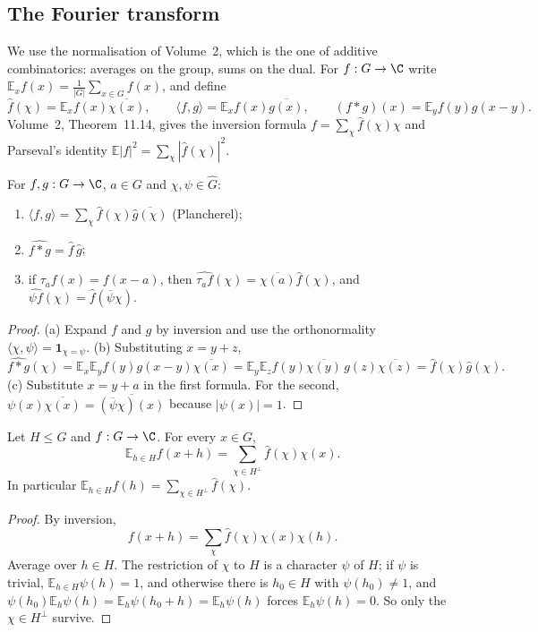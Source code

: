 \subsection*{The Fourier transform}

We use the normalisation of Volume~2, which is the one of additive combinatorics: averages on the group, sums on the dual. For
$f:G\to\C$ write $\mathbb E_{x}f(x)=\frac1{|G|}\sum_{x\in G}f(x)$, and define
\[\hat f(\chi)=\mathbb E_{x}f(x)\overline{\chi(x)},\qquad\langle f,g\rangle=\mathbb E_{x}f(x)\overline{g(x)},\qquad(f*g)(x)=\mathbb E_{y}f(y)g(x-y).\]
Volume~2, Theorem~11.14, gives the inversion formula $f=\sum_\chi\hat f(\chi)\chi$ and Parseval's identity $\mathbb E|f|^2=\sum_\chi|\hat f(\chi)|^2$.

\begin{proposition}\label{prop:finiteconv}
For $f,g:G\to\C$, $a\in G$ and $\chi,\psi\in\widehat G$:
\begin{enumerate}
\item[(a)] $\langle f,g\rangle=\sum_\chi\hat f(\chi)\overline{\hat g(\chi)}$ (Plancherel);
\item[(b)] $\widehat{f*g}=\hat f\,\hat g$;
\item[(c)] if $\tau_af(x)=f(x-a)$, then $\widehat{\tau_af}(\chi)=\overline{\chi(a)}\hat f(\chi)$, and $\widehat{\psi f}(\chi)=\hat f(\overline\psi\chi)$.
\end{enumerate}
\end{proposition}
\begin{proof}
(a) Expand $f$ and $g$ by inversion and use the orthonormality $\langle\chi,\psi\rangle=\mathbf 1_{\chi=\psi}$. (b) Substituting $x=y+z$,
\[\widehat{f*g}(\chi)=\mathbb E_x\mathbb E_yf(y)g(x-y)\overline{\chi(x)}=\mathbb E_y\mathbb E_zf(y)\overline{\chi(y)}\,g(z)\overline{\chi(z)}=\hat f(\chi)\hat g(\chi).\]
(c) Substitute $x=y+a$ in the first formula. For the second, $\psi(x)\overline{\chi(x)}=\overline{(\overline\psi\chi)(x)}$ because $|\psi(x)|=1$.
\end{proof}

\begin{theorem}\label{thm:poissonfinite}
Let $H\le G$ and $f:G\to\C$. For every $x\in G$,
\[\mathbb E_{h\in H}f(x+h)=\sum_{\chi\in H^\perp}\hat f(\chi)\chi(x).\]
In particular $\mathbb E_{h\in H}f(h)=\sum_{\chi\in H^\perp}\hat f(\chi)$.
\end{theorem}
\begin{proof}
By inversion,
\[f(x+h)=\sum_\chi\hat f(\chi)\chi(x)\chi(h).\]
Average over $h\in H$. The restriction of $\chi$ to $H$ is a character $\psi$
of $H$; if $\psi$ is trivial, $\mathbb E_{h\in H}\psi(h)=1$, and otherwise there is $h_0\in H$ with $\psi(h_0)\ne1$, and
$\psi(h_0)\mathbb E_h\psi(h)=\mathbb E_h\psi(h_0+h)=\mathbb E_h\psi(h)$ forces $\mathbb E_h\psi(h)=0$. So only the $\chi\in H^\perp$ survive.
\end{proof}

